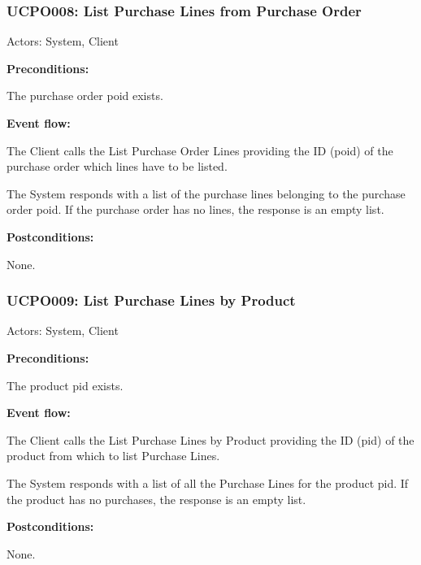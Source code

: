 \begin{ucbox}{\subsubsection{UCPO008: List Purchase Lines from Purchase Order}}
\label{UCPO008}

Actors: System, Client

\textbf{Preconditions:}

\ucitem The purchase order poid exists.

\textbf{Event flow:}

\ucitem The Client calls the List Purchase Order Lines providing the ID (poid) of the purchase order which lines have to be listed.

\ucitem The System responds with a list of the purchase lines belonging to the purchase order poid. If the purchase order has no lines, the response is an empty list.

\textbf{Postconditions:}

\ucitem None.

\end{ucbox}

\begin{ucbox}{\subsubsection{UCPO009: List Purchase Lines by Product}}
\label{UCPO009}

Actors: System, Client

\textbf{Preconditions:}

\ucitem The product pid exists.

\textbf{Event flow:}

\ucitem The Client calls the List Purchase Lines by Product providing the ID (pid) of the product from which to list Purchase Lines.

\ucitem The System responds with a list of all the Purchase Lines for the product pid. If the product has no purchases, the response is an empty list.

\textbf{Postconditions:}

\ucitem None.

\end{ucbox}

